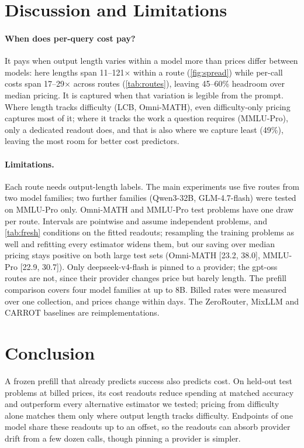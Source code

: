 \documentclass[10pt,twocolumn,letterpaper]{article}
\begin{document}
\section{Discussion and Limitations}
\paragraph{When does per-query cost pay?}
It pays when output length varies within a model more than prices differ between models: here lengths span 11--121$\times$ within a route (\cref{fig:spread}) while per-call costs span 17--29$\times$ across routes (\cref{tab:routes}), leaving 45--60\% headroom over median pricing. It is captured when that variation is legible from the prompt. Where length tracks difficulty (LCB, Omni-MATH), even difficulty-only pricing captures most of it; where it tracks the work a question requires (MMLU-Pro), only a dedicated readout does, and that is also where we capture least (49\%), leaving the most room for better cost predictors.

\paragraph{Limitations.}
Each route needs output-length labels. The main experiments use five routes from two model families; two further families (Qwen3-32B, GLM-4.7-flash) were tested on MMLU-Pro only. Omni-MATH and MMLU-Pro test problems have one draw per route.
Intervals are pointwise and assume independent problems, and \cref{tab:fresh} conditions on the fitted readouts; resampling the training problems as well and refitting every estimator widens them, but our saving over median pricing stays positive on both large test sets (Omni-MATH [23.2, 38.0], MMLU-Pro [22.9, 30.7]). Only deepseek-v4-flash is pinned to a provider; the gpt-oss routes are not, since their provider changes price but barely length. The prefill comparison covers four model families at up to 8B.
Billed rates were measured over one collection, and prices change within days. The ZeroRouter, MixLLM and CARROT baselines are reimplementations.

\section{Conclusion}
A frozen prefill that already predicts success also predicts cost. On held-out test problems at billed prices, its cost readouts reduce spending at matched accuracy and outperform every alternative estimator we tested; pricing from difficulty alone matches them only where output length tracks difficulty. Endpoints of one model share these readouts up to an offset, so the readouts can absorb provider drift from a few dozen calls, though pinning a provider is simpler.

\balance
{\small


}
\end{document}
